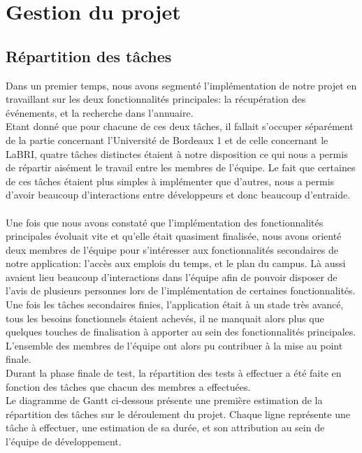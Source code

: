 \chapter{Gestion du projet}

\section{Répartition des tâches}
Dans un premier temps, nous avons segmenté l’implémentation de notre projet en travaillant sur les deux fonctionnalités principales: la récupération des événements, et la recherche dans l’annuaire. \\
Etant donné que pour chacune de ces deux tâches, il fallait s’occuper séparément de la partie concernant l’Université de Bordeaux 1 et de celle concernant le LaBRI, quatre tâches distinctes étaient à notre disposition ce qui nous a permis de répartir aisément le travail entre les membres de l’équipe. Le fait que certaines de ces tâches étaient plus simples à implémenter que d’autres, nous a permis d’avoir beaucoup d’interactions entre développeurs et donc beaucoup d’entraide.\\\\

Une fois que nous avons constaté que l’implémentation des fonctionnalités principales évoluait vite et qu’elle était quasiment finalisée, nous avons orienté deux membres de l’équipe pour s’intéresser aux fonctionnalités secondaires de notre application: l’accès aux emplois du temps, et le plan du campus. Là aussi avaient lieu beaucoup d'interactions dans l’équipe afin de pouvoir disposer de l’avis de plusieurs personnes lors de l’implémentation de certaines fonctionnalités.\\
Une fois les tâches secondaires finies, l’application était à un stade très avancé, tous les besoins fonctionnels  étaient achevés, il ne manquait alors plus que quelques touches de finalisation à apporter au sein des fonctionnalités principales. L’ensemble des membres de l’équipe ont alors pu contribuer à la mise au point finale.\\
Durant la phase finale de test, la répartition des tests à effectuer a été faite en fonction des tâches que chacun des membres a effectuées.\\
Le diagramme de Gantt ci-dessous présente une première estimation de la répartition des tâches sur le déroulement du projet. Chaque ligne représente une tâche à effectuer, une estimation de sa durée, et son attribution au sein de l'équipe de développement. \\


